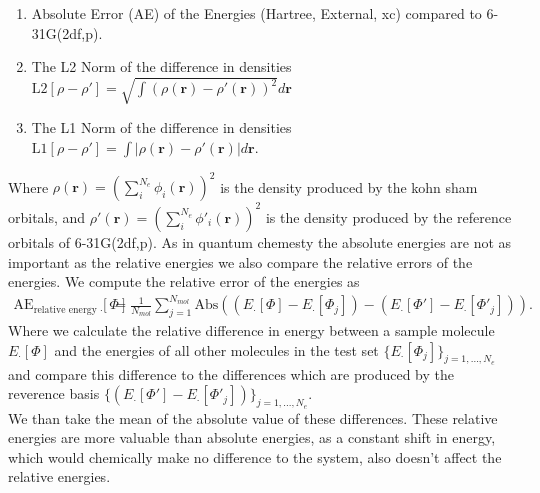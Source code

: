 \begin{enumerate}
    \item Absolute Error (AE) of the Energies (Hartree, External, xc) compared to  6-31G(2df,p).
    \item The L2 Norm of the difference in densities $\text{L2}[\rho-\rho'] = \sqrt{\int (\rho(\mathbf{r})-\rho'(\mathbf{r}))^2} d\mathbf{r}$
    \item The L1 Norm of the difference in densities $\text{L1}[\rho-\rho'] = \int |\rho(\mathbf{r})-\rho'(\mathbf{r})| d\mathbf{r}$.
\end{enumerate}
Where $\rho(\mathbf{r} ) = (\sum_i^{N_e} \phi_i(\mathbf{r}))^2$ is the density produced by the kohn sham orbitals, and $\rho'(\mathbf{r}) = (\sum_i^{N_e} \phi'_i(\mathbf{r}))^2$ is the density produced by the reference orbitals of 6-31G(2df,p).
As in quantum chemesty the absolute energies are not as important as the relative energies we also compare the relative errors of the energies.
We compute the relative error of the energies as
\begin{align}\label{relative_energy_errors}
    \text{AE}_{\text{relative energy } \cdot} [\Phi]  &= \frac{1}{N_{mol}}\sum_{j=1}^{N_{mol}}\text{Abs}\left((E_\cdot[\Phi]-E_\cdot[\Phi_j])-(E_\cdot[\Phi']-E_\cdot[\Phi'_j])\right).
\end{align}
Where we calculate the relative difference in energy between a sample molecule $E_\cdot[\Phi]$ and the energies of all other molecules in the test set $\{E_\cdot[\Phi_j]\}_{j=1,...,N_e}$ and compare this difference to the differences which are produced by the reverence basis $\{(E_\cdot[\Phi']-E_\cdot[\Phi'_j])\}_{j=1,...,N_e}$. \\

We than take the mean of the absolute value of these differences.
These relative energies are more valuable than absolute energies, as a constant shift in energy, which would chemically make no difference to the system, also doesn't affect the relative energies.
